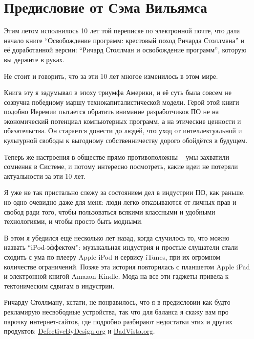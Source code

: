 
\chapter{Предисловие от Сэма Вильямса}

Этим летом исполнилось 10 лет той переписке по электронной почте,
что дала начало книге ``Освобождение программ: крестовый поход
Ричарда Столлмана'' и её доработанной версии: ``Ричард Столлман
и освобождение программ'', которую вы держите в руках.

Не стоит и говорить, что за эти 10 лет многое изменилось в этом мире.

Книга эту я задумывал в эпоху триумфа Америки, и её суть была совсем
не созвучна победному маршу технокапиталистической модели.
Герой этой книги подобно Иеремии пытается обратить внимание
разработчиков ПО не на экономический потенциал компьютерных
программ, а на этические ценности и обязательства. Он старается донести
до людей, что уход от интеллектуальной и культурной свободы к
выгодному собственничеству дорого обойдётся в будущем.

Теперь же настроения в обществе прямо противоположны -- умы
захватили сомнения в Системе, и потому интересно посмотреть,
какие идеи не потеряли актуальности за эти 10 лет.

Я уже не так пристально слежу за состоянием дел в индустрии ПО,
как раньше, но одно очевидно даже для меня: люди легко отказываются
от личных прав и свобод ради того, чтобы пользоваться всякими
классными и удобными технологиями, и чтобы просто быть модными.

В этом я убедился ещё несколько лет назад, когда случилось то, что
можно назвать ``iPod-эффектом'': музыкальная индустрия и простые
слушатели стали сходить с ума по плееру Apple iPod и сервису iTunes,
при их огромном количестве ограничений. Позже эта история повторилась
с планшетом Apple iPad и электронной книгой Amazon Kindle. Мода на
все эти гаджеты привела к тектоническим сдвигам в индустрии.

Ричарду Столлману, кстати, не понравилось, что я в предисловии как будто
рекламирую несвободные устройства, так что для баланса я скажу
вам про парочку интернет-сайтов, где подробно разбирают недостатки
этих и других продуктов:  \url{DefectiveByDesign.org} и \url{BadVista.org}.

